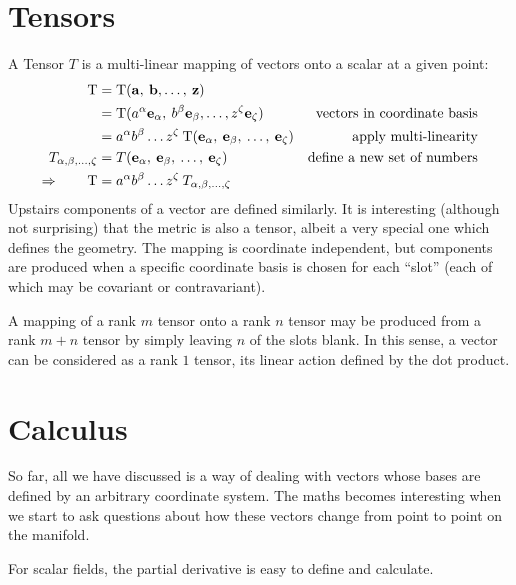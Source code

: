\section{Tensors}
A Tensor $T$ is a multi-linear mapping of vectors onto a scalar at a given point:
\begin{align}
  \mathrm{T} 
  &= 
  \mathrm{T}(\mathbf{a},\:\mathbf{b},\ldots,\:\mathbf{z})
  &
  \nonumber
  \\
  &= 
  \mathrm{T}(a^\alpha\mathbf{e}_\alpha,\:b^\beta\mathbf{e}_\beta,\ldots,z^\zeta\mathbf{e}_\zeta)  
  &\text{vectors in coordinate basis}
  \nonumber
  \\
  &= 
  a^\alpha b^\beta \ldots z^\zeta \: 
  \mathrm{T}(\mathbf{e}_\alpha,\:\mathbf{e}_\beta,\:\ldots,\:\mathbf{e}_\zeta)  
  &\text{apply multi-linearity}
  \nonumber
  \\
  T_{\alpha,\beta,\ldots,\zeta} 
  &=  
  T(\mathbf{e}_\alpha,\:\mathbf{e}_\beta,\:\ldots,\:\mathbf{e}_\zeta)
  &\text{define a new set of numbers}
  \nonumber
  \\
  \Rightarrow\qquad
  \mathrm{T}
  &= 
  a^\alpha b^\beta \ldots z^\zeta \: 
  T_{\alpha,\beta,\ldots,\zeta}
  &
  \nonumber
\end{align}
Upstairs components of a vector are defined similarly. It is interesting (although not surprising) that the metric is also a tensor, albeit a very special one which defines the geometry. The mapping is coordinate independent, but components are produced when a specific coordinate basis is chosen for each ``slot'' (each of which may be covariant or contravariant).

A mapping of a rank $m$ tensor onto a rank $n$ tensor may be produced from a rank $m+n$ tensor by simply leaving $n$ of the slots blank. In this sense, a vector can be considered as a rank $1$ tensor, its linear action defined by the dot product.

\section{Calculus}
So far, all we have discussed is a way of dealing with vectors whose bases are defined by an arbitrary coordinate system. The maths becomes interesting when we start to ask questions about how these vectors change from point to point on the manifold.

For scalar fields, the partial derivative is easy to define and calculate.

